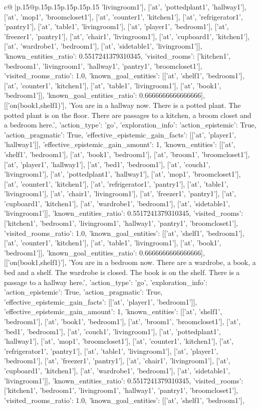 \documentclass{article}
\begin{document}
{\begin{supertabular}{c@{$\;$}|p{.15\linewidth}@{}p{.15\linewidth}p{.15\linewidth}p{.15\linewidth}p{.15\linewidth}p{.15\linewidth}}
{{{'livingroom1'], ['at', 'pottedplant1', 'hallway1'], ['at', 'mop1', 'broomcloset1'], ['at', 'counter1', 'kitchen1'], ['at', 'refrigerator1', 'pantry1'], ['at', 'table1', 'livingroom1'], ['at', 'player1', 'bedroom1'], ['at', 'freezer1', 'pantry1'], ['at', 'chair1', 'livingroom1'], ['at', 'cupboard1', 'kitchen1'], ['at', 'wardrobe1', 'bedroom1'], ['at', 'sidetable1', 'livingroom1']], 'known_entities_ratio': 0.5517241379310345, 'visited_rooms': ['kitchen1', 'bedroom1', 'livingroom1', 'hallway1', 'pantry1', 'broomcloset1'], 'visited_rooms_ratio': 1.0, 'known_goal_entities': [['at', 'shelf1', 'bedroom1'], ['at', 'counter1', 'kitchen1'], ['at', 'table1', 'livingroom1'], ['at', 'book1', 'bedroom1']], 'known_goal_entities_ratio': 0.6666666666666666}}], [['on(book1,shelf1)'], 'You are in a hallway now. There is a potted plant. The potted plant is on the floor. There are passages to a kitchen, a broom closet and a bedroom here.', {'action_type': 'go', 'exploration_info': {'action_epistemic': True, 'action_pragmatic': True, 'effective_epistemic_gain_facts': [['at', 'player1', 'hallway1']], 'effective_epistemic_gain_amount': 1, 'known_entities': [['at', 'shelf1', 'bedroom1'], ['at', 'book1', 'bedroom1'], ['at', 'broom1', 'broomcloset1'], ['at', 'player1', 'hallway1'], ['at', 'bed1', 'bedroom1'], ['at', 'couch1', 'livingroom1'], ['at', 'pottedplant1', 'hallway1'], ['at', 'mop1', 'broomcloset1'], ['at', 'counter1', 'kitchen1'], ['at', 'refrigerator1', 'pantry1'], ['at', 'table1', 'livingroom1'], ['at', 'chair1', 'livingroom1'], ['at', 'freezer1', 'pantry1'], ['at', 'cupboard1', 'kitchen1'], ['at', 'wardrobe1', 'bedroom1'], ['at', 'sidetable1', 'livingroom1']], 'known_entities_ratio': 0.5517241379310345, 'visited_rooms': ['kitchen1', 'bedroom1', 'livingroom1', 'hallway1', 'pantry1', 'broomcloset1'], 'visited_rooms_ratio': 1.0, 'known_goal_entities': [['at', 'shelf1', 'bedroom1'], ['at', 'counter1', 'kitchen1'], ['at', 'table1', 'livingroom1'], ['at', 'book1', 'bedroom1']], 'known_goal_entities_ratio': 0.6666666666666666}}], [['on(book1,shelf1)'], 'You are in a bedroom now. There are a wardrobe, a book, a bed and a shelf. The wardrobe is closed. The book is on the shelf. There is a passage to a hallway here.', {'action_type': 'go', 'exploration_info': {'action_epistemic': True, 'action_pragmatic': True, 'effective_epistemic_gain_facts': [['at', 'player1', 'bedroom1']], 'effective_epistemic_gain_amount': 1, 'known_entities': [['at', 'shelf1', 'bedroom1'], ['at', 'book1', 'bedroom1'], ['at', 'broom1', 'broomcloset1'], ['at', 'bed1', 'bedroom1'], ['at', 'couch1', 'livingroom1'], ['at', 'pottedplant1', 'hallway1'], ['at', 'mop1', 'broomcloset1'], ['at', 'counter1', 'kitchen1'], ['at', 'refrigerator1', 'pantry1'], ['at', 'table1', 'livingroom1'], ['at', 'player1', 'bedroom1'], ['at', 'freezer1', 'pantry1'], ['at', 'chair1', 'livingroom1'], ['at', 'cupboard1', 'kitchen1'], ['at', 'wardrobe1', 'bedroom1'], ['at', 'sidetable1', 'livingroom1']], 'known_entities_ratio': 0.5517241379310345, 'visited_rooms': ['kitchen1', 'bedroom1', 'livingroom1', 'hallway1', 'pantry1', 'broomcloset1'], 'visited_rooms_ratio': 1.0, 'known_goal_entities': [['at', 'shelf1', 'bedroom1'], }}}
\end{supertabular}}
\end{document}
